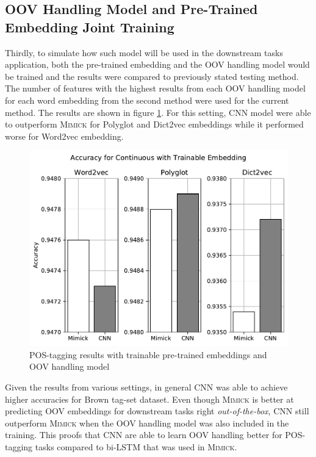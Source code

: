       \subsection{OOV Handling Model and Pre-Trained Embedding Joint Training}
      Thirdly, to simulate how such model will be used in the
      downstream tasks application, both the pre-trained embedding and
      the OOV handling model would be trained and the results were
      compared to previously stated testing method. The number of
      features with the highest results from each OOV handling model
      for each word embedding from the second method were used for the
      current method. The results are shown in figure
      \ref{fig:postag_train_embed_results}. For this setting, CNN
      model were able to outperform \textsc{Mimick} for Polyglot and
      Dict2vec embeddings while it performed worse for Word2vec
      embedding.
      \begin{figure}[H]
        \centering
        \includegraphics[width=0.8\linewidth]{images/train_embed.pdf}
        \caption{POS-tagging results with trainable pre-trained embeddings and OOV handling model}
        \label{fig:postag_train_embed_results}
      \end{figure}
      \par Given the results from various settings, in general CNN was
      able to achieve higher accuracies for Brown tag-set dataset.
      Even though \textsc{Mimick} is better at predicting OOV
      embeddings for downstream tasks right \textit{out-of-the-box},
      CNN still outperform \textsc{Mimick} when the OOV handling model
      was also included in the training. This proofs that CNN are able
      to learn OOV handling better for POS-tagging tasks compared to
      bi-LSTM that was used in \textsc{Mimick}.

